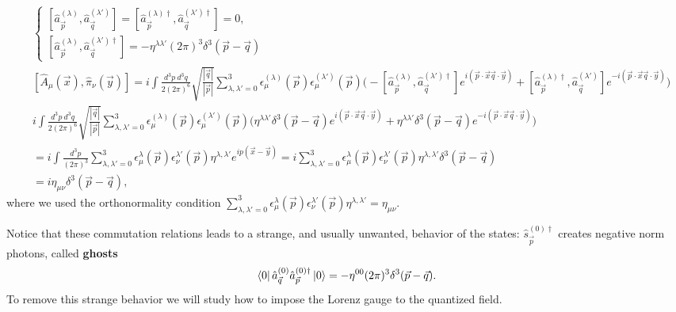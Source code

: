 \begin{align*}
    &\begin{cases}
        [\hat{a}_{\vec p}^{(\lambda)},\hat{a}_{\vec q}^{(\lambda')}]=[\hat{a}_{\vec p}^{(\lambda)\dagger},\hat{a}_{\vec q}^{(\lambda')\dagger}]=0,\\
        [\hat{a}_{\vec p}^{(\lambda)},\hat{a}_{\vec q}^{(\lambda')\dagger}]=-\eta^{\lambda\lambda'}(2\pi)^3\delta^3(\vec p-\vec q)
    \end{cases}\\
    &[\hat{A}_\mu(\vec x),\hat{\pi}_\nu(\vec y)]=i\int\frac{d^3p\ d^3q}{2(2\pi)^6}\sqrt{\frac{|\vec q|}{|\vec p|}}\sum_{\lambda,\lambda'=0}^{3}\epsilon_\mu^{(\lambda)}(\vec p)\epsilon_\mu^{(\lambda')}(\vec p)\bigg(-[\hat{a}_{\vec p}^{(\lambda)},\hat{a}_{\vec q}^{(\lambda')\dagger}]e^{i(\vec p\cdot\vec x\vec q\cdot\vec y)}+[\hat{a}_{\vec p}^{(\lambda)\dagger},\hat{a}_{\vec q}^{(\lambda')}]e^{-i(\vec p\cdot\vec x\vec q\cdot\vec y)}\bigg)\\&i\int\frac{d^3p\ d^3q}{2(2\pi)^6}\sqrt{\frac{|\vec q|}{|\vec p|}}\sum_{\lambda,\lambda'=0}^{3}\epsilon_\mu^{(\lambda)}(\vec p)\epsilon_\mu^{(\lambda')}(\vec p)\bigg(\eta^{\lambda\lambda'}\delta^3(\vec p-\vec q)e^{i(\vec p\cdot\vec x\vec q\cdot\vec y)}+\eta^{\lambda\lambda'}\delta^3(\vec p-\vec q)e^{-i(\vec p\cdot\vec x\vec q\cdot\vec y)}\bigg)\\&=i\int\frac{d^3p}{(2\pi)^3}\sum_{\lambda,\lambda'=0}^{3}\epsilon^{\lambda}_\mu(\vec p)\epsilon^{\lambda'}_\nu(\vec p)\eta^{\lambda,\lambda'}e^{ip(\vec x-\vec y)}=i\sum_{\lambda,\lambda'=0}^{3}\epsilon^{\lambda}_\mu(\vec p)\epsilon^{\lambda'}_\nu(\vec p)\eta^{\lambda,\lambda'}\delta^3(\vec p-\vec q)\\&=i\eta_{\mu\nu}\delta^3(\vec p-\vec q),
\end{align*}
where we used the orthonormality condition $\sum_{\lambda,\lambda'=0}^{3}\epsilon^{\lambda}_\mu(\vec p)\epsilon^{\lambda'}_\nu(\vec p)\eta^{\lambda,\lambda'}=\eta_{\mu\nu}$.

Notice that these commutation relations leads to a strange, and usually unwanted, behavior of the states: $\hat{s}^{(0)\dagger}_{\vec p}$ creates negative norm photons, called \textbf{ghosts}
\begin{equation*}
    \bra{0}\hat{a}^{(0)}_{\vec q}\hat{a}^{(0)\dagger}_{\vec p}\ket{0}=-\eta^{00}(2\pi)^3\delta^3(\vec p-\vec q).
\end{equation*}
To remove this strange behavior we will study how to impose the Lorenz gauge to the quantized field.
